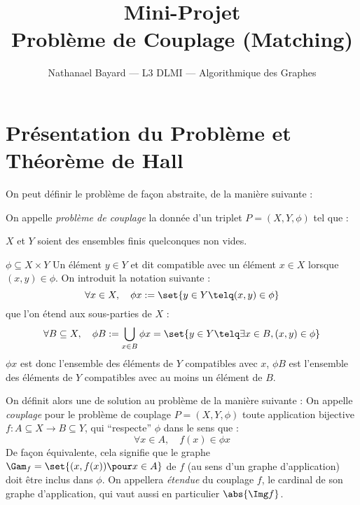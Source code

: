 








\author{Nathanael Bayard --- L3 DLMI --- Algorithmique des Graphes}
\title{Mini-Projet \\ Problème de Couplage (Matching)}
\date{}
    
 \maketitle
\section{Présentation du Problème et Théorème de Hall}
On peut définir le problème de façon abstraite, de la manière suivante :

\SEP\jdefi On appelle \emph{problème de couplage} la donnée d'un triplet $P = (X,Y,\phi)$ tel que :
\mathL
\item $X$ et $Y$ soient des ensembles finis quelconques non vides.
\item $\phi \subseteq X \times Y$
\endL
Un élément $y \in Y$ et dit compatible avec un élément $x \in X$ lorsque $(x,y) \in \phi$. On introduit la notation suivante :
\[ \forall x \in X, \quad \phi x := \set { y \in Y \telq (x,y) \in \phi} \]
que l'on étend aux sous-parties de $X$ :
\[ \forall B \subseteq X, \quad \phi B := \bigcup_{x \in B} \phi x = \set{y \in Y \telq \exists x \in B,  (x,y) \in \phi}\]
$\phi x$ est donc l'ensemble des éléments de $Y$ compatibles avec $x$, $\phi B$ est l'ensemble des éléments de $Y$ compatibles avec au moins un élément de $B$.
\SEP

On définit alors une de solution au problème de la manière suivante :
\SEP\jdefi On appelle \emph{couplage} pour le problème de couplage $P = (X,Y,\phi)$ toute application bijective $f : A \subseteq X \to B \subseteq Y$, qui ``respecte'' $\phi$ dans le sens que :
\[ \forall x \in A, \quad f(x) \in \phi x \]
De façon équivalente, cela signifie que le graphe $\Gam_f = \set{(x,f(x)) \pour x \in A}$ de $f$ (au sens d'un graphe d'application) doit être inclus dans $\phi$. On appellera \emph{étendue} du couplage $f$, le cardinal de son graphe d'application, qui vaut aussi en particulier $\abs{\Img f}$.

